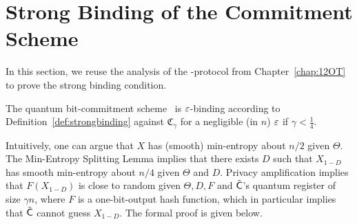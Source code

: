 \section{Strong Binding of the Commitment Scheme} \label{sec:strongbinding}
 In this section, we reuse the
analysis of the \OT-protocol from Chapter~\ref{chap:12OT} to prove the
strong binding condition.

\begin{theorem}
  The quantum bit-commitment scheme \comm\ is $\varepsilon$-binding
  according to Definition~\ref{def:strongbinding} against $\mathfrak{C}_{\gamma}$
  for a negligible (in $n$) $\varepsilon$ if $\gamma < \frac14$.
\end{theorem}
Intuitively, one can argue that $X$ has (smooth) min-entropy about $n/2$ given
$\Theta$.  The 
Min-Entropy Splitting Lemma implies that there exists
$D$ such that $X_{1-D}$ has smooth min-entropy about $n/4$ given
$\Theta$ and $D$. Privacy amplification implies that $F(X_{1-D})$ is
close to random given $\Theta, D, F$ and $\tilde{\sf C}$'s quantum register of
size $\gamma n$, where $F$ is a \univ one-bit-output hash function,
which in particular implies that $\tilde{\sf C}$ cannot guess $X_{1-D}$. The
formal proof is given below.

